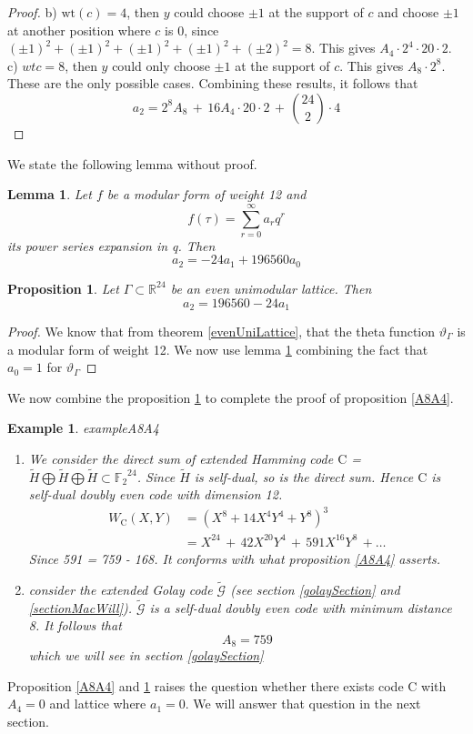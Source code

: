\documentclass{article}
\newtheorem{lemma}[theorem]{Lemma}
\newtheorem{example}[theorem]{Example}
\newtheorem{prop}[theorem]{Proposition}
\numberwithin{equation}{theorem}
\numberwithin{figure}{theorem}
\newcommand{\Ftwo}{\ensuremath{\mathbb{F}_2}}
\newcommand{\cCodes}{\ensuremath{\widetilde{\mathscr{G}}}}
\newcommand{\simpleCodes}{\ensuremath{\mathrm{C}}}
\newcommand{\weightEnumerator}[3]{\ensuremath{W_{#1}(#2,#3)}}
\newcommand{\thetaFunction}[1]{\ensuremath{\vartheta_{#1}}}
\newcommand{\wt}[1]{\ensuremath{\text{wt}(#1)}}
\newcommand{\Real}{\ensuremath{\mathbb{R}}}
\begin{document}
\begin{proof}
b) $\wt{c} = 4$, then $y$ could choose $\pm1$ at the support of $c$ and choose $\pm1$ at another position where $c$ is 0, since $(\pm1)^2 + (\pm1)^2+ (\pm1)^2+ (\pm1)^2 + (\pm2)^2 = 8$. This gives $A_4 \cdot 2^4 \cdot 20 \cdot 2$.\\
c) $wt{c} = 8$, then $y$ could only choose $\pm1$ at the support of $c$. This gives $A_8 \cdot 2^8$.\\
These are the only possible cases. Combining these results, it follows that 
\begin{equation}\label{a2A8A4Eqn}
	a_2 = 2^8A_8 \, + \,  16 A_4 \cdot 20 \cdot 2 \, + \, \binom{24}{2}\cdot 4
\end{equation}
\end{proof}
We state the following lemma without proof.
\begin{lemma}\label{a2a0a1}
Let $f$ be a modular form of weight 12 and
\[
	f(\tau) = \sum_{r = 0}^{\infty}a_rq^r
\]
its power series expansion in q. Then
\[
	a_2 = -24a_1 + 196560a_0
\]
\end{lemma}
\begin{prop}\label{a2a1}
Let $\Gamma \subset \Real^24$ be an even unimodular lattice. Then 
\[
	a_2 = 196560 - 24a_1
\] 
\end{prop}
\begin{proof}
We know that from theorem \ref{evenUniLattice}, that the theta function $\thetaFunction{\Gamma}$ is a modular form of weight 12. We now use lemma \ref{a2a0a1} combining the fact that $a_0 = 1$ for $\thetaFunction{\Gamma}$
\end{proof}
We now combine the proposition \ref{a2a1} to complete the proof of proposition \ref{A8A4}.

\begin{example}{exampleA8A4}
\begin{enumerate}
	\item
We consider the direct sum of extended Hamming code {\simpleCodes} = $\widetilde{H} \bigoplus \widetilde{H} \bigoplus \widetilde{H} \subset \Ftwo^{24}$. Since $\widetilde{H}$ is self-dual, so is the direct sum. Hence {\simpleCodes} is self-dual doubly even code with dimension 12.\\
\begin{align*}
	\weightEnumerator{\simpleCodes}{X}{Y} &= (X^8 + 14X^4Y^4 + Y^8)^3 \\
	&= X^{24} \,+\, 42X^{20}Y^4 \,+\, 591X^{16}Y^8 \, + \ldots
\end{align*}
Since 591 = 759 - 168. It conforms with what proposition \ref{A8A4} asserts.
\item
consider the extended Golay code {\cCodes} (see section \ref{golaySection} and \ref{sectionMacWill}).  {\cCodes} is a self-dual doubly even code with minimum distance 8. It follows that
\[
	A_8 = 759
\]
which we will see in section \ref{golaySection}
\end{enumerate}
\end{example}
Proposition \ref{A8A4} and \ref{a2a1} raises the question whether there exists code $\simpleCodes$ with $A_4 = 0$ and lattice where $a_1 = 0$. We will answer that question in the next section.
\newpage
\end{document}
